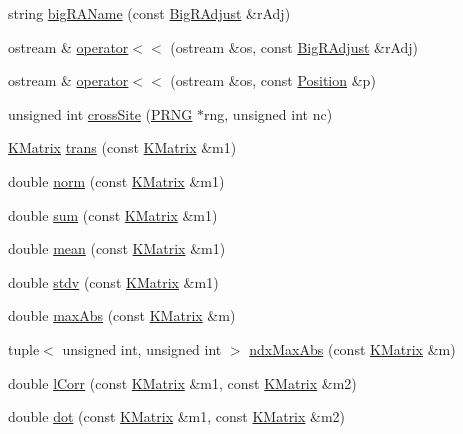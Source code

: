 \begin{DoxyCompactItemize}
string \hyperlink{namespace_k_base_a536b2b2ffe14301d09921444479d22bc}{big\-R\-A\-Name} (const \hyperlink{namespace_k_base_abb184480a342df4bda049658b7a0a251}{Big\-R\-Adjust} \&r\-Adj)
\item 
ostream \& \hyperlink{namespace_k_base_af018f57e0217110c3ea93e0a94c94c92}{operator$<$$<$} (ostream \&os, const \hyperlink{namespace_k_base_abb184480a342df4bda049658b7a0a251}{Big\-R\-Adjust} \&r\-Adj)
\item 
ostream \& \hyperlink{namespace_k_base_a49ebe418e2f42461961f56f2fcf96157}{operator$<$$<$} (ostream \&os, const \hyperlink{class_k_base_1_1_position}{Position} \&p)
\item 
unsigned int \hyperlink{namespace_k_base_ae424dcaa73dce0a50383c89a87da7907}{cross\-Site} (\hyperlink{class_k_base_1_1_p_r_n_g}{P\-R\-N\-G} $\ast$rng, unsigned int nc)
\item 
\hyperlink{class_k_base_1_1_k_matrix}{K\-Matrix} \hyperlink{namespace_k_base_af76d55e885f062f41939b4d8802a552f}{trans} (const \hyperlink{class_k_base_1_1_k_matrix}{K\-Matrix} \&m1)
\item 
double \hyperlink{namespace_k_base_ac04eb4ecf7a4427f95aec552d4ba3b21}{norm} (const \hyperlink{class_k_base_1_1_k_matrix}{K\-Matrix} \&m1)
\item 
double \hyperlink{namespace_k_base_a2b6e9528c70ddd70032df696150ff015}{sum} (const \hyperlink{class_k_base_1_1_k_matrix}{K\-Matrix} \&m1)
\item 
double \hyperlink{namespace_k_base_aa492d98b388ebd6d2edd0bfe6ae16024}{mean} (const \hyperlink{class_k_base_1_1_k_matrix}{K\-Matrix} \&m1)
\item 
double \hyperlink{namespace_k_base_a082c1f9b23d177af71847da7edd2d550}{stdv} (const \hyperlink{class_k_base_1_1_k_matrix}{K\-Matrix} \&m1)
\item 
double \hyperlink{namespace_k_base_a5f0d9a675a0d3542811b34bccaf9c652}{max\-Abs} (const \hyperlink{class_k_base_1_1_k_matrix}{K\-Matrix} \&m)
\item 
tuple$<$ unsigned int, unsigned int $>$ \hyperlink{namespace_k_base_a0e6f01b377066ff486b45ba37993ba88}{ndx\-Max\-Abs} (const \hyperlink{class_k_base_1_1_k_matrix}{K\-Matrix} \&m)
\item 
double \hyperlink{namespace_k_base_a2aa608b4caec20c1e5004e6318475371}{l\-Corr} (const \hyperlink{class_k_base_1_1_k_matrix}{K\-Matrix} \&m1, const \hyperlink{class_k_base_1_1_k_matrix}{K\-Matrix} \&m2)
\item 
double \hyperlink{namespace_k_base_a866d8730819523ee14b6f8766468a120}{dot} (const \hyperlink{class_k_base_1_1_k_matrix}{K\-Matrix} \&m1, const \hyperlink{class_k_base_1_1_k_matrix}{K\-Matrix} \&m2)

\end{DoxyCompactItemize}
